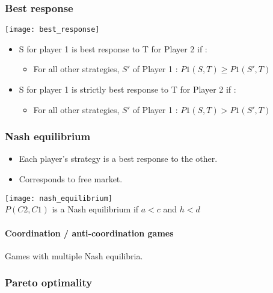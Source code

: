 \subsubsection{Best response}

\begin{table}[H]
    \centering
    \texttt{[image: best\_response]}
\end{table}

\begin{itemize}
\item S for player 1 is best response to T for Player 2 if :
	\begin{itemize}
	\item For all other strategies, $S'$ of Player 1 : $P1(S, T) \geq P1(S', T)$
	\end{itemize}
\item S for player 1 is strictly best response to T for Player 2 if :
	\begin{itemize}
	\item For all other strategies, $S'$ of Player 1 : $P1(S, T) > P1(S', T)$
	\end{itemize}
\end{itemize}

\subsubsection{Nash equilibrium}

\begin{itemize}
\item Each player's strategy is a best response to the other.
\item Corresponds to free market.
\end{itemize}

\begin{table}[H]
    \centering
    \texttt{[image: nash\_equilibrium]}\\
    $P(C2, C1)$ is a Nash equilibrium if $a < c$ and $h < d$
\end{table}

\paragraph{Coordination / anti-coordination games}

Games with multiple Nash equilibria.

\subsubsection{Pareto optimality}

